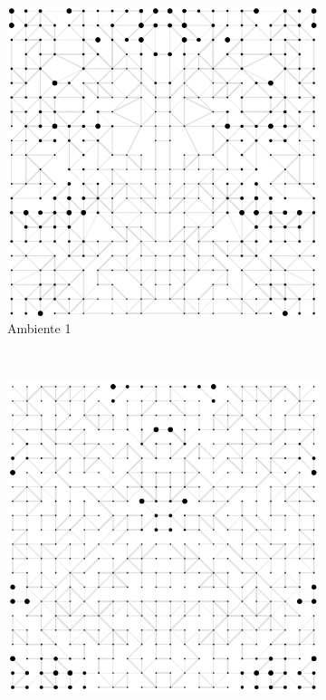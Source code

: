 \documentclass{llncs}
\begin{document}
\begin{figure}[ht]
      \centering
      \begin{subfigure}[b]{0.48\textwidth}
              \includegraphics[width=\textwidth]{images/sim1.png}
              \caption{Ambiente 1}
              \label{fig:ambiente1}
      \end{subfigure}
      ~
      \begin{subfigure}[b]{0.48\textwidth}
              \includegraphics[width=\textwidth]{images/sim2.png}

\end{subfigure}
\end{figure}
\end{document}
